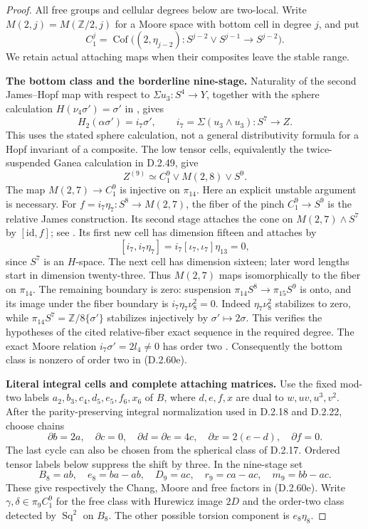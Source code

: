 \begin{proof}
All free groups and cellular degrees below are two-local.
Write $M(2,j)=M(\mathbb Z/2,j)$ for a Moore space with bottom
cell in degree $j$, and put
\[
 C_1^j=\operatorname{Cof}
 \bigl((2,\eta_{j-2}):S^{j-2}\vee S^{j-1}\longrightarrow S^{j-2}\bigr).
 \tag{D.2.60c}
\]
We retain actual attaching maps when their composites leave
the stable range.

\textbf{The bottom class and the borderline nine-stage.}
Naturality of the second James--Hopf map with respect to
$\Sigma u_3:S^4\to Y$, together with the sphere calculation
$H(\nu_4\sigma')=\sigma'$ in
\cite[Proposition~13, p.~9]{FGHStricklandToda}, gives
\[
 H_2(\alpha\sigma')=i_7\sigma',\qquad
                  i_7=\Sigma(u_3\wedge u_3):S^7\to Z.
 \tag{D.2.60d}
\]
This uses the stated sphere calculation, not a general
distributivity formula for a Hopf invariant of a composite.
The low tensor cells, equivalently the twice-suspended Ganea
calculation in D.2.49, give
\[
                 Z^{(9)}\simeq C_1^9\vee M(2,8)\vee S^9.
 \tag{D.2.60e}
\]
The map $M(2,7)\to C_1^9$ is injective on $\pi_{14}$.
Here an explicit unstable argument is necessary.  For
$f=i_7\eta_7:S^8\to M(2,7)$, the fiber of the pinch
$C_1^9\to S^9$ is the relative James construction.  Its
second stage attaches the cone on $M(2,7)\wedge S^7$ by
$[\mathrm{id},f]$; see
\cite[Lemmas~2.1 and 2.3--2.5, pp.~4--5]{FGHJinZhu2024}.
Its first new cell has dimension fifteen and attaches by
\[
 [i_7,i_7\eta_7]=i_7[\iota_7,\iota_7]\eta_{13}=0,
 \tag{D.2.60f}
\]
since $S^7$ is an $H$-space.  The next cell has dimension
sixteen; later word lengths start in dimension twenty-three.
Thus $M(2,7)$ maps isomorphically to the fiber on $\pi_{14}$.
The remaining boundary is zero: suspension
$\pi_{14}S^8\to\pi_{15}S^9$ is onto, and its image under the
fiber boundary is $i_7\eta_7\nu_8^2=0$.
Indeed $\eta_7\nu_8^2$ stabilizes to zero, while
$\pi_{14}S^7=\mathbb Z/8\{\sigma'\}$ stabilizes injectively
by $\sigma'\mapsto2\sigma$.  This verifies the hypotheses
of the cited relative-fiber exact sequence in the required
degree.  The exact Moore relation
$i_7\sigma'=2l_4\ne0$ has order two
\cite[Lemma~2.8(ii)]{EH5MorisugiMukai2000}.
Consequently the bottom class is nonzero of order two in
\textup{(D.2.60e)}.

\textbf{Literal integral cells and complete attaching matrices.}
Use the fixed mod-two labels
$a_2,b_3,c_4,d_5,e_5,f_6,x_6$ of $B$, where $d,e,f,x$
are dual to $w,uv,u^3,v^2$.  After the parity-preserving
integral normalization used in D.2.18 and D.2.22, choose chains
\[
 \partial b=2a,\quad \partial c=0,\quad
 \partial d=\partial e=4c,\quad
 \partial x=2(e-d),\quad \partial f=0.
 \tag{D.2.60g}
\]
The last cycle can also be chosen from the spherical class
of D.2.17.  Ordered tensor labels below suppress the shift
by three.  In the nine-stage set
\[
 B_8=ab,\quad e_8=ba-ab,\quad
 D_9=ac,\quad r_9=ca-ac,\quad m_9=bb-ac.
 \tag{D.2.60h}
\]
These give respectively the Chang, Moore and free factors
in \textup{(D.2.60e)}.  Write $\gamma,\delta\in\pi_9C_1^9$
for the free class with Hurewicz image $2D$ and the order-two
class detected by $\operatorname{Sq}^2$ on $B_8$.
The other possible torsion component is $e_8\eta_8$.


\end{proof}
